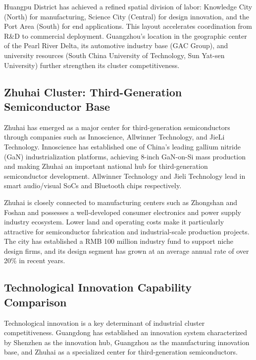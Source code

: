 \documentclass[12pt,a4paper]{article}
\begin{document}
Huangpu District has achieved a refined spatial division of labor:
Knowledge City (North) for manufacturing, Science City (Central) for
design innovation, and the Port Area (South) for end applications. This
layout accelerates coordination from R\&D to commercial deployment.
Guangzhou's location in the geographic center of the Pearl River Delta,
its automotive industry base (GAC Group), and university resources
(South China University of Technology, Sun Yat-sen University) further
strengthen its cluster competitiveness.

\subsection{Zhuhai Cluster: Third-Generation Semiconductor Base}
\label{sec:zh_cluster}

Zhuhai has emerged as a major center for third-generation semiconductors
through companies such as Innoscience, Allwinner Technology, and JieLi
Technology. Innoscience has established one of China's leading gallium
nitride (GaN) industrialization platforms, achieving 8-inch GaN-on-Si
mass production and making Zhuhai an important national hub for
third-generation semiconductor development. Allwinner Technology and
Jieli Technology lead in smart audio/visual SoCs and Bluetooth chips
respectively.

Zhuhai is closely connected to manufacturing centers such as Zhongshan
and Foshan and possesses a well-developed consumer electronics and power
supply industry ecosystem. Lower land and operating costs make it
particularly attractive for semiconductor fabrication and
industrial-scale production projects. The city has established a
RMB 100 million industry fund to support niche design firms, and its
design segment has grown at an average annual rate of over 20\% in
recent years.

\subsection{Technological Innovation Capability Comparison}
\label{sec:innovation_compare}

Technological innovation is a key determinant of industrial cluster
competitiveness. Guangdong has established an innovation system
characterized by Shenzhen as the innovation hub, Guangzhou as the
manufacturing innovation base, and Zhuhai as a specialized center for
third-generation semiconductors.
\end{document}

